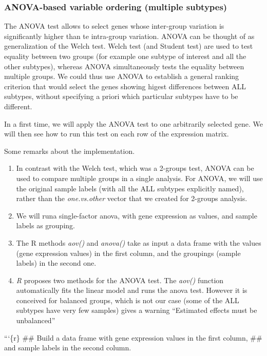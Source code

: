 \subsubsection{ANOVA-based variable ordering (multiple
subtypes)}\label{anova-based-variable-ordering-multiple-subtypes}

The {ANOVA} test allows to select genes whose inter-group variation is
significantly higher than te intra-group variation. ANOVA can be thought
of as generalization of the Welch test. Welch test (and Student test)
are used to test equality between two groups (for example one subtype of
interest and all the other subtypes), whereas ANOVA simultaneously tests
the equality between multiple groups. We could thus use ANOVA to
establish a general ranking criterion that would select the genes
showing higest differences between ALL subtypes, without specifying a
priori which particular subtypes have to be different.

In a first time, we will apply the ANOVA test to one arbitrarily
selected gene. We will then see how to run this test on each row of the
expression matrix.

Some remarks about the implementation.

\begin{enumerate}
\def\labelenumi{\arabic{enumi}.}
\item
  In contrast with the Welch test, which was a 2-groups test, ANOVA can
  be used to compare multiple groups in a single analysis. For ANOVA, we
  will use the original sample labels (with all the ALL subtypes
  explicitly named), rather than the \emph{one.vs.other} vector that we
  created for 2-groups analysis.
\item
  We will runa single-factor anova, with gene expression as values, and
  sample labels as grouping.
\item
  The R methods \emph{aov()} and \emph{anova()} take as input a data
  frame with the values (gene expression values) in the first column,
  and the groupings (sample labels) in the second one.
\item
  \emph{R} proposes two methods for the ANOVA test. The \emph{aov()}
  function automatically fits the linear model and runs the anova test.
  However it is conceived for balanced groups, which is not our case
  (some of the ALL subtypes have very few samples) gives a warning
  ``Estimated effects must be unbalanced''
\end{enumerate}

```\{r\} \#\# Build a data frame with gene expression values in the
first column, \#\# and sample labels in the second column.

